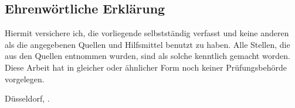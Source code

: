 \begin{otherlanguage}{ngerman}

\chapter*{Ehrenwörtliche Erklärung}

Hiermit versichere ich, die vorliegende \thesistypegerman{} selbstständig verfasst und keine anderen als die angegebenen Quellen und Hilfsmittel benutzt zu haben.
Alle Stellen, die aus den Quellen entnommen wurden, sind als solche kenntlich gemacht worden.
Diese Arbeit hat in gleicher oder ähnlicher Form noch keiner Prüfungsbehörde vorgelegen.

\vspace{3cm}

\noindent Düsseldorf, \thesissubmissionday{}. \DTMmonthname{\thesissubmissionmonth} \thesissubmissionyear{} \hfill \thesisauthor{}

\end{otherlanguage}